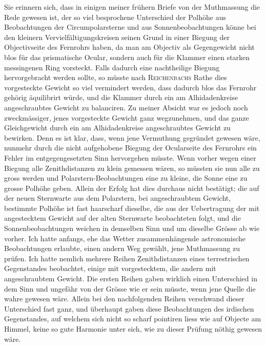 \par\indent Sie erinnern sich, dass in einigen meiner frühern Briefe von der Muthmassung die Rede gewesen ist, der so viel besprochene Unterschied der Polhöhe aus Beobachtungen der Circumpolarsterne und aus Sonnenbeobachtungen könne bei den kleinern Vervielfältigungskreisen seinen Grund in einer Biegung der Objectivseite des Fernrohrs haben, da man am Objectiv als Gegengewicht nicht blos für das prismatische Ocular, sondern auch für die Klammer einen starken messingenen Ring vorsteckt. Falls dadurch eine nachtheilige Biegung hervorgebracht werden sollte, so müsste nach \textsc{Reichenbachs} Rathe dies vorgesteckte Gewicht so viel vermindert werden, dass dadurch blos das Fernrohr gehörig äquilibrirt würde, und die Klammer durch ein am Alhidadenkreise angeschraubtes Gewicht zu balanciren. Zu meiner Absicht war es jedoch noch zweckmässiger, jenes vorgesteckte Gewicht ganz wegzunehmen, und das ganze Gleichgewicht durch ein am Alhidadenkreise angeschraubtes Gewicht zu bewirken. Denn es ist klar, dass, wenn jene Vermuthung gegründet gewesen wäre, nunmehr durch die nicht aufgehobene Biegung der Ocularseite des Fernrohrs ein Fehler im entgegengesetzten Sinn hervorgehen müsste. Wenn vorher wegen einer Biegung alle Zenithdistanzen zu klein gemessen wären, so müssten sie nun alle zu gross werden und Polarstern-Beobachtungen eine zu kleine, die Sonne eine zu grosse Polhöhe geben. Allein der Erfolg hat dies durchaus nicht bestätigt; die auf der neuen Sternwarte aus dem Polarstern, bei angeschraubtem Gewicht, bestimmte Polhöhe ist fast haarscharf dieselbe, die aus der Uebertragung der mit angestecktem Gewicht auf der alten Sternwarte beobachteten folgt, und die Sonnenbeobachtungen weichen in demselben Sinn und um dieselbe Grösse ab wie vorher. Ich hatte anfangs, ehe das Wetter zusammenhängende astronomische Beobachtungen erlaubte, einen andern Weg gewählt, jene Muthmassung zu prüfen. Ich hatte nemlich mehrere Reihen Zenithdistanzen eines terrestrischen Gegenstandes beobachtet, einige mit vorgestecktem, die andern mit angeschraubtem Gewicht. Die ersten Reihen gaben wirklich einen Unterschied in dem Sinn und ungefähr von der Grösse wie er sein müsste, wenn jene Quelle die wahre gewesen wäre. Allein bei den nachfolgenden Reihen verschwand dieser Unterschied fast ganz, und überhaupt gaben diese Beobachtungen des irdischen Gegenstandes, auf welchem sich nicht so scharf pointiren liess wie auf Objecte am Himmel, keine so gute Harmonie unter sich, wie zu dieser Prüfung nöthig gewesen wäre.

